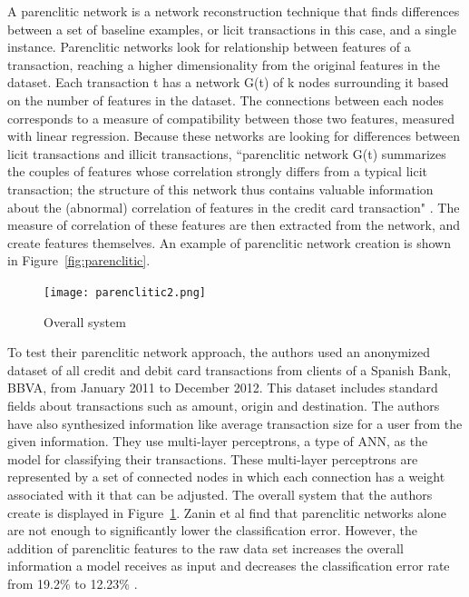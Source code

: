 \documentclass[midd]{thesis}
\begin{document}
A parenclitic network is a network reconstruction technique that finds differences between a set of baseline examples, or licit transactions in this case, and a single instance. Parenclitic networks look for relationship between features of a transaction, reaching a higher dimensionality from the original features in the dataset. Each transaction t has a network G(t) of k nodes surrounding it based on the number of features in the dataset. The connections between each nodes corresponds to a measure of compatibility between those two features, measured with linear regression. Because these networks are looking for differences between licit transactions and illicit transactions, ``parenclitic network G(t) summarizes the couples of features whose correlation strongly differs from a typical licit transaction; the structure of this network thus contains valuable information about the (abnormal) correlation of features in the credit card transaction" \cite{Zanin2018}. The measure of correlation of these features are then extracted from the network, and create features themselves. An example of parenclitic network creation is shown in Figure~\ref{fig:parenclitic}. 


\begin{figure}
\centering
  \texttt{[image: parenclitic2.png]}
  \caption{Overall system \cite{Zanin2018}}
  \label{fig:parenclitic2}
\end{figure}

To test their parenclitic network approach, the authors used an anonymized dataset of all credit and debit card transactions from clients of a Spanish Bank, BBVA, from January 2011 to December 2012. This dataset includes standard fields about transactions such as amount, origin and destination. The authors have also synthesized information like average transaction size for a user from the given information. They use multi-layer perceptrons, a type of ANN, as the model for classifying their transactions. These multi-layer perceptrons are represented by a set of connected nodes in which each connection has a weight associated with it that can be adjusted. The overall system that the authors create is displayed in Figure~\ref{fig:parenclitic2}. Zanin et al find that parenclitic networks alone are not enough to significantly lower the classification error. However, the addition of parenclitic features to the raw data set increases the overall information a model receives as input and decreases the classification error rate from 19.2\% to 12.23\% \cite{Zanin2018}. 
\end{document}
